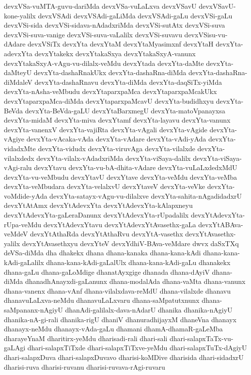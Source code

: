 {devxVSa-vuMTA-guvu-dariMda
devxVSa-vuLaLxva
devxVSavU
devxVSavU-kone-yalilx
devxVSAdi
devxVSAdi-gaLiMda
devxVSAdi-gaLu
devxVSi-gaLu
devxVSi-sida
devxVSi-sidava-nAdadxriMda
devxVSi-sutAtx
devxVSi-suva
devxVSi-suva-vanige
devxVSi-suva-vaLalilx
devxVSi-suvavu
devxVSisu-vu-dAdare
devxVSiTx
devxYta
devxYtaM
devxYtaMyasimxnf
devxYtaH
devxYta-adevxYta
devxYtakekx
devxYtakaSxya
devxYtakaSxyA-vanunx
devxYtakaSxyA-vAgu-vu-dilalx-veMdu
devxYtada
devxYta-daMte
devxYta-daMteyU
devxYta-dashaRnakUkx
devxYta-dashaRna-diMda
devxYta-dashaRna-diMdaleV
devxYta-dashaRnavu
devxYta-diMda
devxYta-daqSiTx-yiMda
devxYta-nAsha-veMbudu
devxYtaparxpaMca
devxYtaparxpaMcakUkx
devxYtaparxpaMca-diMda
devxYtaparxpaMcavU
devxYta-budidhxyu
devxYta-BeVda
devxYta-BeVda-gaLU
devxYtaBarxmegU
devxYta-matoVpanayxsa
devxYta-midaM
devxYta-miva
devxYtamf
devxYta-layavu
devxYta-vanunx
devxYta-vanenxV
devxYta-vajiRta
devxYta-vAgali
devxYta-vAgide
devxYta-vAgiye
devxYta-vAcaka-vAda
devxYta-vAdare
devxYta-vAdi-yAda
devxYta-vidadxMte
devxYta-vidudx
devxYta-viruvAga
devxYta-vilalxde
devxYta-vilalxdedx
devxYta-vilalx-vAdadxriMda
devxYta-viSaya-dalilx
devxYta-viSaya-vAgi-ralu
devxYtavu
devxYta-vu-bA-dhita-vAdare
devxYta-vuLaLxdedxMdU
devxYta-vu-veMbudu
devxYtavU
devxYtave
devxYta-veMdu
devxYta-veMba
devxYta-veMbudara
devxYta-velalxvU
devxYtaveV
devxYta-veVke
devxYta-voMdide-yAda
devxYta-satayx-vAgu-vu-dilalxve
devxYta-sahita-nAgadidadxrU
devxYtAtAmx
devxYtAdevxYta
devxYtAdevxYta-kAlapxneyu
devxYtAdevxYta-gaLeraDanunx
devxYtAdevxYta-rUpadalilx
devxYtAdevxYta-rUpa-veMdu
devxYtAdevxYtavu
devxYtAdevxYtAvasethx-gaLa
devxYtABAva-veMdeV
devxYtAthaRda
devxYtAthaRvu
devxYtA-vasethx
devxYtAvasethx-yalilx
devxYtAvasethxyu
devxYteV
devxYdhiV-BAva-veMdare
dwvx
daSxTXq
deVSa-diMda
dha
dhakekx
dhana
dhana-kanaka
dhana-kana-kAdi
dhana-kana-kAdi-gaLalilx
dhana-kana-kAdi-gaLalUlx
dhana-kana-kAdi-gaLu
dhanakekx
dhana-gaLu
dhana-gaLoMdige
dhanatAyxgige
dhanada
dhana-dAyiV
dhana-diMda
dhanadhAnayxdi-gaLanunx
dhana-modalAda
dhana-vaMta
dhana-vanunx
dhana-vanenx
dhana-vAnf
dhana-vilalxdava-reMdU
dhana-vilalxde
dhanavu
dhanavuLaLxva-neMdu
dhanavuLaLxvaru
dhana-saMpatutxnunx
dhana-saMpananx-nAgiyU
dhanAdi-galilalx-dava-nAdarU
dhanika
dhanika-nAgiyU
dhanika-nA-gi-rali
dhanika-rigU
dhaniV
dhanuradhijayxM
dhaneVna
dhanayx
dhanayx-neMdu
dhanayx-vAda-gaLu
dhamani
dhamA-dhamaR-gaLeMba
dharayeYnaM
dharitirx-yeMdu
dharisadi-rali
dhari-sali
dhari-salapxTaTx-vu-gaLAgi
dhari-salapxTiTxde
dhari-salapxTiTxve-yeMdu
dhari-salapxTuTx-dAgiyU
dhari-salapxDuva
dhari-salapxDuvavo
dharisi-koMDive
dharisida
dhari-sidadxrU
dharisi-ruva
dharisi-ruvanu
dharisi-ruvava-rAgi-ruvaru
}

